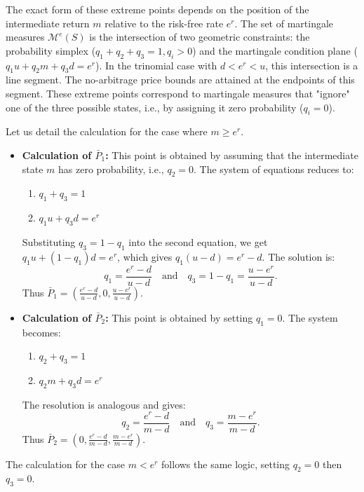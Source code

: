 The exact form of these extreme points depends on the position of the intermediate return $m$ relative to the risk-free rate $e^r$.
The set of martingale measures $\mathcal{M}^e(S)$ is the intersection of two geometric constraints: the probability simplex ($q_1+q_2+q_3=1, q_i>0$) and the martingale condition plane ($q_1u + q_2m + q_3d = e^r$). In the trinomial case with $d < e^r < u$, this intersection is a line segment. The no-arbitrage price bounds are attained at the endpoints of this segment. These extreme points correspond to martingale measures that "ignore" one of the three possible states, i.e., by assigning it zero probability ($q_i=0$).

Let us detail the calculation for the case where $m \ge e^r$.

\begin{itemize}
    \item \textbf{Calculation of $\bar{P}_1$:} This point is obtained by assuming that the intermediate state $m$ has zero probability, i.e., $q_2=0$. The system of equations reduces to:
    \begin{enumerate}
        \item $q_1 + q_3 = 1$
        \item $q_1u + q_3d = e^r$
    \end{enumerate}
    Substituting $q_3 = 1 - q_1$ into the second equation, we get $q_1u + (1 - q_1)d = e^r$, which gives $q_1(u - d) = e^r - d$. The solution is:
    \[
    q_1 = \frac{e^r - d}{u - d} \quad \text{and} \quad q_3 = 1 - q_1 = \frac{u - e^r}{u - d}.
    \]
    Thus $\bar{P}_1 = ( \frac{e^r-d}{u-d}, 0, \frac{u-e^r}{u-d} )$.

    \item \textbf{Calculation of $\bar{P}_2$:} This point is obtained by setting $q_1=0$. The system becomes:
    \begin{enumerate}
        \item $q_2 + q_3 = 1$
        \item $q_2m + q_3d = e^r$
    \end{enumerate}
    The resolution is analogous and gives:
    \[
    q_2 = \frac{e^r - d}{m - d} \quad \text{and} \quad q_3 = \frac{m - e^r}{m - d}.
    \]
    Thus $\bar{P}_2 = ( 0, \frac{e^r-d}{m-d}, \frac{m-e^r}{m-d} )$.
\end{itemize}

The calculation for the case $m < e^r$ follows the same logic, setting $q_2=0$ then $q_3=0$.

